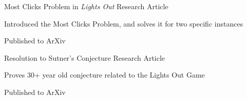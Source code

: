\documentclass[a4paper]{awesome-cv}
\begin{document}
	\begin{cventries}
		\cvprojectentry
		{Most Clicks Problem in \textit{Lights Out}} %
		{Research Article} %
		{
			\begin{cvitems} %
				\item {Introduced the Most Clicks Problem, and solves it for two specific instances}
				\item {Published to ArXiv}
			\end{cvitems}
		}

		\cvprojectentry
		{Resolution to Sutner's Conjecture} %
		{Research Article} %
		{
			\begin{cvitems} %
				\item {Proves 30+ year old conjecture related to the Lights Out Game}
				\item {Published to ArXiv}
			\end{cvitems}
		}
	\end{cventries}
	
	
\end{document}
